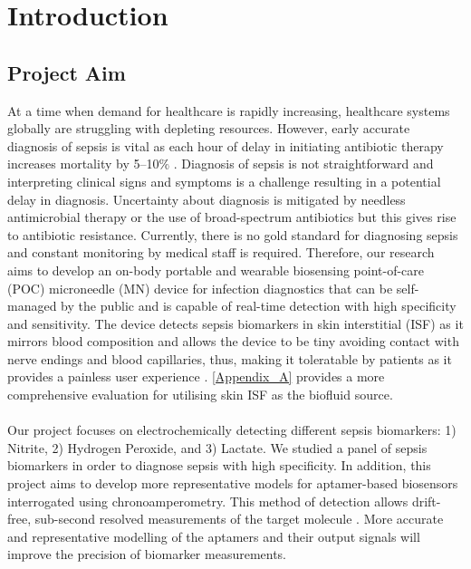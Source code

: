 \section{Introduction}
\subsection{Project Aim}
At a time when demand for healthcare is rapidly increasing, healthcare systems globally are struggling with depleting resources.  However, early accurate diagnosis of sepsis is vital as each hour of delay in initiating antibiotic therapy increases mortality by 5–10$\%$ \cite{heikenfeld2018lab,bauer2010molecular}. Diagnosis of sepsis is not straightforward and interpreting clinical signs and symptoms is a challenge resulting in a potential delay in diagnosis. Uncertainty about diagnosis is mitigated by needless antimicrobial therapy or the use of broad-spectrum antibiotics but this gives rise to antibiotic resistance\cite{hung2020current}. Currently, there is no gold standard for diagnosing sepsis and constant monitoring by medical staff is required. Therefore, our research aims to develop an on-body portable and wearable biosensing point-of-care (POC) microneedle (MN) device for infection diagnostics that can be self-managed by the public and is capable of real-time detection with high specificity and sensitivity. The device detects sepsis biomarkers in skin interstitial (ISF) as it mirrors blood composition and allows the device to be tiny avoiding contact with nerve endings and blood capillaries, thus, making it toleratable by patients as it provides a painless user experience \cite{liu2020microneedles}. \autoref{Appendix_A} provides a more comprehensive evaluation for utilising skin ISF as the biofluid source.\\\\
Our project focuses on electrochemically detecting different sepsis biomarkers: 1) Nitrite, 2) Hydrogen Peroxide, and 3) Lactate. We studied a panel of sepsis biomarkers in order to diagnose sepsis with high specificity. In addition, this project aims to develop more representative models for aptamer-based biosensors interrogated using chronoamperometry. This method of detection allows drift-free, sub-second resolved measurements of the target molecule \cite{arroyo2018subsecond}. More accurate and representative modelling of the aptamers and their output signals will improve the precision of biomarker measurements.\\\\